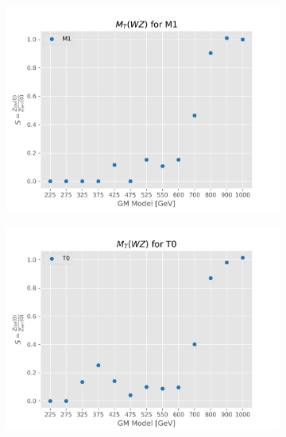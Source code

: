 \documentclass[../Bachelorarbeit.tex]{subfiles}
\begin{document}
\begin{figure}[h]
\begin{subfigure}{0.45\textwidth}
    \end{subfigure}
    \begin{subfigure}{0.45\textwidth}
        \includegraphics[width=\textwidth]{Plots/gm_relevanze/MTWZ_op_M1.png}

    \end{subfigure}
    \begin{subfigure}{0.45\textwidth}
        \includegraphics[width=\textwidth]{Plots/gm_relevanze/MTWZ_op_T0.png}


\end{subfigure}
\end{figure}
\end{document}

